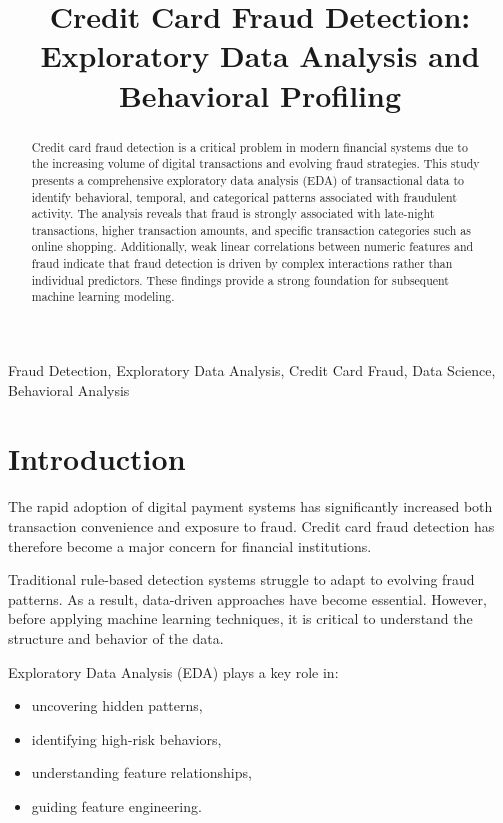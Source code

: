 \documentclass[conference]{IEEEtran}
\title{Credit Card Fraud Detection: Exploratory Data Analysis and Behavioral Profiling}
\author{
\IEEEauthorblockN{Nomusa Shongwe}
\IEEEauthorblockA{
Data Science | Machine Learning | Engineering\\
Email: shongwenomusa990822@gmail.com
}
}
\begin{document}
\maketitle

\begin{abstract}
Credit card fraud detection is a critical problem in modern financial systems due to the increasing volume of digital transactions and evolving fraud strategies. This study presents a comprehensive exploratory data analysis (EDA) of transactional data to identify behavioral, temporal, and categorical patterns associated with fraudulent activity. The analysis reveals that fraud is strongly associated with late-night transactions, higher transaction amounts, and specific transaction categories such as online shopping. Additionally, weak linear correlations between numeric features and fraud indicate that fraud detection is driven by complex interactions rather than individual predictors. These findings provide a strong foundation for subsequent machine learning modeling.
\end{abstract}

\begin{IEEEkeywords}
Fraud Detection, Exploratory Data Analysis, Credit Card Fraud, Data Science, Behavioral Analysis
\end{IEEEkeywords}

\section{Introduction}

The rapid adoption of digital payment systems has significantly increased both transaction convenience and exposure to fraud. Credit card fraud detection has therefore become a major concern for financial institutions.

Traditional rule-based detection systems struggle to adapt to evolving fraud patterns. As a result, data-driven approaches have become essential. However, before applying machine learning techniques, it is critical to understand the structure and behavior of the data.

Exploratory Data Analysis (EDA) plays a key role in:
\begin{itemize}
    \item uncovering hidden patterns,
    \item identifying high-risk behaviors,
    \item understanding feature relationships,
    \item guiding feature engineering.
\end{itemize}
\end{document}
